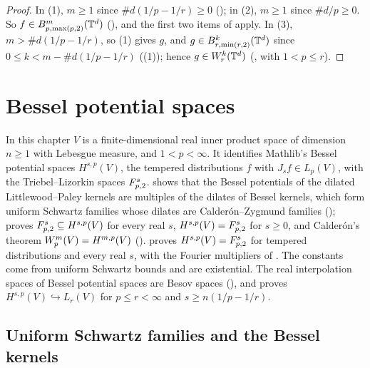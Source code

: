 \begin{proof}
\leanok
{}
In (1), $m \geq 1$ since $\#d (1/p - 1/r) \geq 0$ (); in (2),
$m \geq 1$ since $\#d/p \geq 0$. So $f \in B^{m}_{p,\max(p,2)}(\mathbb{T}^d)$
(), and the first two items of 
apply. In (3), $m > \#d (1/p - 1/r)$, so (1) gives $g$, and $g \in B^{k}_{r,\min(r,2)}(\mathbb{T}^d)$
since $0 \leq k < m - \#d(1/p - 1/r)$ ((1)); hence
$g \in W^{k}_{r}(\mathbb{T}^d)$ (, with $1 < p \leq r$).
\end{proof}

\chapter{Bessel potential spaces}
\label{ch:bessel-potential-spaces}

In this chapter $V$ is a finite-dimensional real inner product space of dimension $n \geq 1$
with Lebesgue measure, and $1 < p < \infty$. It identifies Mathlib's Bessel potential spaces
$H^{s,p}(V)$, the tempered distributions $f$ with $J_s f \in L_p(V)$, with the Triebel--Lizorkin
spaces $F^{s}_{p,2}$.  shows that the Bessel potentials of the
dilated Littlewood--Paley kernels are multiples of the dilates of Bessel kernels, which form
uniform Schwartz families whose dilates are Calder\'on--Zygmund families ();
 proves $F^{s}_{p,2} \subseteq H^{s,p}(V)$ for every real
$s$, $H^{s,p}(V) = F^{s}_{p,2}$ for $s \geq 0$, and Calder\'on's theorem
$W^{m}_{p}(V) = H^{m,p}(V)$ ().
 proves $H^{s,p}(V) = F^{s}_{p,2}$ for tempered
distributions and every real $s$, with the Fourier multipliers of .
The constants come from uniform Schwartz bounds and are existential. The real interpolation spaces
of Bessel potential spaces are
Besov spaces (), and
 proves $H^{s,p}(V) \hookrightarrow L_r(V)$ for
$p \leq r < \infty$ and $s \geq n(1/p - 1/r)$.

\section{Uniform Schwartz families and the Bessel kernels}
\label{sec:bessel-kernels}

